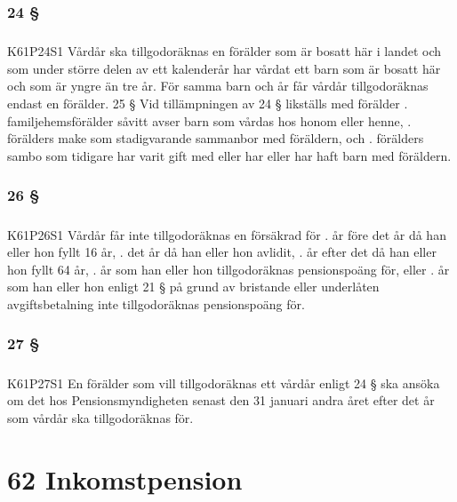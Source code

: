\documentclass[a4paper,notitlepage,openany,10pt]{book}
\begin{document}
\subsection*{24 §}
\paragraph*{}
{\tiny K61P24S1}
Vårdår ska tillgodoräknas en förälder som är bosatt här i landet och som under större delen av ett kalenderår har vårdat ett barn som är bosatt här och som är yngre än tre år.
För samma barn och år får vårdår tillgodoräknas endast en förälder. 25 § Vid tillämpningen av 24 § likställs med förälder
. familjehemsförälder såvitt avser barn som vårdas hos honom eller henne,
. förälders make som stadigvarande sammanbor med föräldern, och
. förälders sambo som tidigare har varit gift med eller har eller har haft barn med föräldern.
\subsection*{26 §}
\paragraph*{}
{\tiny K61P26S1}
Vårdår får inte tillgodoräknas en försäkrad för
. år före det år då han eller hon fyllt 16 år,
. det år då han eller hon avlidit,
. år efter det då han eller hon fyllt 64 år,
. år som han eller hon tillgodoräknas pensionspoäng för, eller
. år som han eller hon enligt 21 § på grund av bristande eller underlåten avgiftsbetalning inte tillgodoräknas pensionspoäng för.
\subsection*{27 §}
\paragraph*{}
{\tiny K61P27S1}
En förälder som vill tillgodoräknas ett vårdår enligt 24 § ska ansöka om det hos Pensionsmyndigheten senast den 31 januari andra året efter det år som vårdår ska tillgodoräknas för.
\chapter*{62 Inkomstpension}
\end{document}
